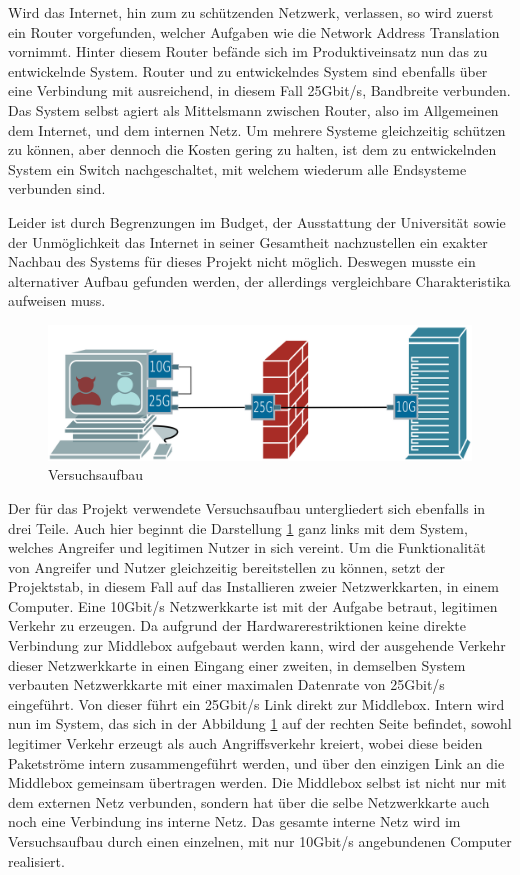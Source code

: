 \documentclass[../review_2.tex]{subfiles}
\begin{document}
Wird das Internet, hin zum zu schützenden Netzwerk, verlassen, so wird zuerst ein Router vorgefunden, welcher Aufgaben wie die Network Address Translation vornimmt. Hinter diesem Router befände sich im Produktiveinsatz nun das zu entwickelnde System. Router und zu entwickelndes System sind ebenfalls über eine Verbindung mit ausreichend, in diesem Fall 25Gbit/s, Bandbreite verbunden. Das System selbst agiert als Mittelsmann zwischen Router, also im Allgemeinen dem Internet, und dem internen Netz. Um mehrere Systeme gleichzeitig schützen zu können, aber dennoch die Kosten gering zu halten, ist dem zu entwickelnden System ein Switch nachgeschaltet, mit welchem wiederum alle Endsysteme verbunden sind.

Leider ist durch Begrenzungen im Budget, der Ausstattung der Universität sowie der Unmöglichkeit das Internet in seiner Gesamtheit nachzustellen ein exakter Nachbau des Systems für dieses Projekt nicht möglich. Deswegen musste ein alternativer Aufbau gefunden werden, der allerdings vergleichbare Charakteristika aufweisen muss.

\begin{figure}[h]
    \centering
    \includegraphics[width=0.7\linewidth]{img/Netwerkplan-Versuch}
    \caption{Versuchsaufbau}
    \label{fig:Versuchsaufbau}
\end{figure}

Der für das Projekt verwendete Versuchsaufbau untergliedert sich ebenfalls in drei Teile. Auch hier beginnt die Darstellung \ref{fig:Versuchsaufbau} ganz links mit dem System, welches Angreifer und legitimen Nutzer in sich vereint. Um die Funktionalität von Angreifer und Nutzer gleichzeitig bereitstellen zu können, setzt der Projektstab, in diesem Fall auf das Installieren zweier Netzwerkkarten, in einem Computer. Eine 10Gbit/s Netzwerkkarte ist mit der Aufgabe betraut, legitimen Verkehr zu erzeugen. Da aufgrund der Hardwarerestriktionen keine direkte Verbindung zur Middlebox aufgebaut werden kann, wird der ausgehende Verkehr dieser Netzwerkkarte in einen Eingang einer zweiten, in demselben System verbauten Netzwerkkarte mit einer maximalen Datenrate von 25Gbit/s eingeführt. Von dieser führt ein 25Gbit/s Link direkt zur Middlebox. Intern wird nun im System, das sich in der Abbildung \ref{fig:Versuchsaufbau} auf der rechten Seite befindet, sowohl legitimer Verkehr erzeugt als auch Angriffsverkehr kreiert, wobei diese beiden Paketströme intern zusammengeführt werden, und über den einzigen Link an die Middlebox gemeinsam übertragen werden. Die Middlebox selbst ist nicht nur mit dem externen Netz verbunden, sondern hat über die selbe Netzwerkkarte auch noch eine Verbindung ins interne Netz. Das gesamte interne Netz wird im Versuchsaufbau durch einen einzelnen, mit nur 10Gbit/s angebundenen Computer realisiert.
\end{document}
